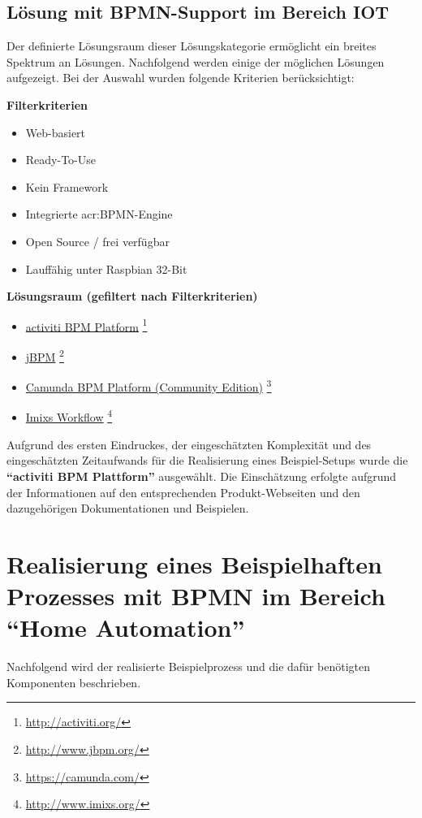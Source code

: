 \subsection{Lösung mit BPMN-Support im Bereich IOT}
Der definierte Lösungsraum dieser Lösungskategorie ermöglicht ein breites Spektrum an Lösungen. Nachfolgend werden einige der möglichen Lösungen aufgezeigt. Bei der Auswahl wurden folgende Kriterien berücksichtigt:

\textbf{Filterkriterien}
\begin{itemize}
\item Web-basiert
\item Ready-To-Use
\item Kein Framework
\item Integrierte \gls{acr:BPMN}-Engine
\item Open Source / frei verfügbar
\item Lauffähig unter Raspbian 32-Bit
\end{itemize}

\textbf{Lösungsraum (gefiltert nach Filterkriterien)}
\begin{itemize}
\item \hyperlink{http://activiti.org/}{activiti BPM Platform} \footnote{\url{http://activiti.org/}}
\item \hyperlink{http://www.jbpm.org/}{jBPM} \footnote{\url{http://www.jbpm.org/}}
\item \hyperlink{https://camunda.com/}{Camunda BPM Platform (Community Edition)} \footnote{\url{https://camunda.com/}}
\item \hyperlink{http://www.imixs.org/}{Imixs Workflow} \footnote{\url{http://www.imixs.org/}}
\end{itemize}

Aufgrund des ersten Eindruckes, der eingeschätzten Komplexität und des eingeschätzten Zeitaufwands für die Realisierung eines Beispiel-Setups wurde die \textbf{"`activiti BPM Plattform"'} ausgewählt. Die Einschätzung erfolgte aufgrund der Informationen auf den entsprechenden Produkt-Webseiten und den dazugehörigen Dokumentationen und Beispielen.


\newpage
\section{Realisierung eines Beispielhaften Prozesses mit BPMN im Bereich "`Home Automation"'} \label{sec:AnalyseRPI:Beispiel}
Nachfolgend wird der realisierte Beispielprozess und die dafür benötigten Komponenten beschrieben.

